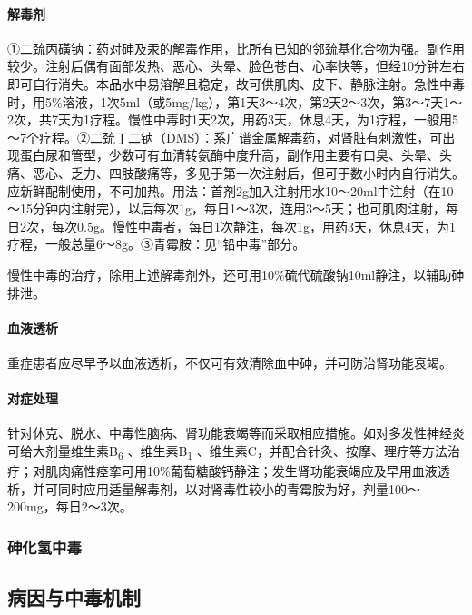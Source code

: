 \paragraph{解毒剂}

①二巯丙磺钠：药对砷及汞的解毒作用，比所有已知的邻巯基化合物为强。副作用较少。注射后偶有面部发热、恶心、头晕、脸色苍白、心率快等，但经10分钟左右即可自行消失。本品水中易溶解且稳定，故可供肌肉、皮下、静脉注射。急性中毒时，用5\%溶液，1次5ml（或5mg/kg），第1天3～4次，第2天2～3次，第3～7天1～2次，共7天为1疗程。慢性中毒时1天2次，用药3天，休息4天，为1疗程，一般用5～7个疗程。②二巯丁二钠（DMS）：系广谱金属解毒药，对肾脏有刺激性，可出现蛋白尿和管型，少数可有血清转氨酶中度升高，副作用主要有口臭、头晕、头痛、恶心、乏力、四肢酸痛等，多见于第一次注射后，但可于数小时内自行消失。应新鲜配制使用，不可加热。用法：首剂2g加入注射用水10～20ml中注射（在10～15分钟内注射完），以后每次1g，每日1～3次，连用3～5天；也可肌肉注射，每日2次，每次0.5g。慢性中毒者，每日1次静注，每次1g，用药3天，休息4天，为1疗程，一般总量6～8g。③青霉胺：见“铅中毒”部分。

慢性中毒的治疗，除用上述解毒剂外，还可用10\%硫代硫酸钠10ml静注，以辅助砷排泄。

\paragraph{血液透析}

重症患者应尽早予以血液透析，不仅可有效清除血中砷，并可防治肾功能衰竭。

\paragraph{对症处理}

针对休克、脱水、中毒性脑病、肾功能衰竭等而采取相应措施。如对多发性神经炎可给大剂量维生素B\textsubscript{6}
、维生素B\textsubscript{1}
、维生素C，并配合针灸、按摩、理疗等方法治疗；对肌肉痛性痉挛可用10\%葡萄糖酸钙静注；发生肾功能衰竭应及早用血液透析，并可同时应用适量解毒剂，以对肾毒性较小的青霉胺为好，剂量100～200mg，每日2～3次。

\subsubsection{砷化氢中毒}

\subsection{病因与中毒机制}

